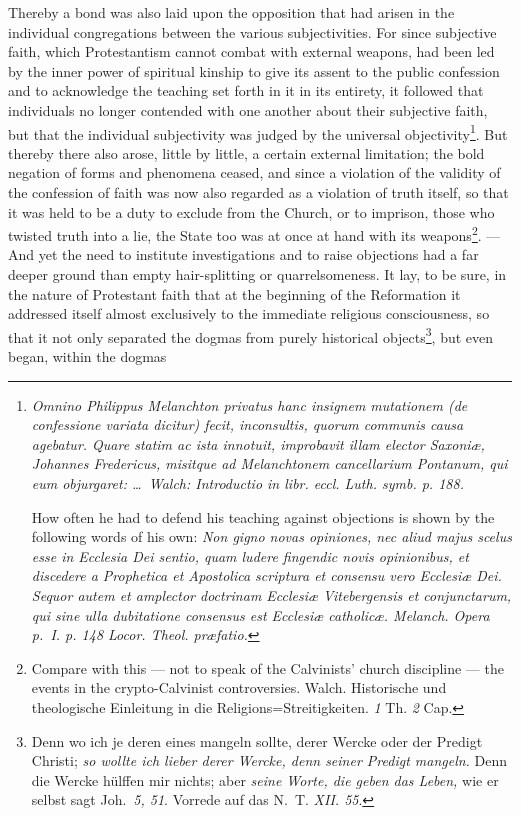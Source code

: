\documentclass[12pt]{book}
\newcommand{\opage}[1]{\marginnote{\footnotesize\textit{[#1]}}}
\begin{document}
Thereby a bond was also laid upon the opposition that had arisen in the
individual congregations between the various subjectivities. For since
subjective faith, which Protestantism cannot combat with external weapons,
had been led by the inner power of spiritual kinship to give its assent to
the public confession and to acknowledge the teaching set forth in it in its
entirety, it followed that individuals no longer contended with one another
about their subjective faith, but that the individual subjectivity was judged
by the universal objectivity\footnote{\textit{Omnino Philippus Melanchton
privatus hanc insignem mutationem (de confessione variata dicitur) fecit,
inconsultis, quorum communis causa agebatur. Quare statim ac ista innotuit,
improbavit illam elector Saxoniæ, Johannes Fredericus, misitque ad
Melanchtonem cancellarium Pontanum, qui eum objurgaret: \ldots\ Walch:
Introductio in libr. eccl. Luth. symb. p. 188.}

How often he had to defend his teaching against objections is shown by the
following words of his own: \textit{Non gigno novas opiniones, nec aliud
majus scelus esse in Ecclesia Dei sentio, quam ludere fingendic novis
opinionibus, et discedere a Prophetica et Apostolica scriptura et consensu
vero Ecclesiæ Dei. \emph{Sequor autem et amplector doctrinam Ecclesiæ
Vitebergensis et conjunctarum, qui sine ulla dubitatione consensus est
Ecclesiæ catholicæ.} Melanch. Opera p.~I. p. 148 Locor. Theol. præfatio.}}.
But thereby there also arose, little
\opage{73} \setcounter{footnote}{0}%
by little, a certain external limitation; the bold negation of forms and
phenomena ceased, and since a violation of the validity of the confession of
faith was now also regarded as a violation of truth itself, so that it was
held to be a duty to exclude from the Church, or to imprison, those who
twisted truth into a lie, the State too was at once at hand with its
weapons\footnote{Compare with this --- not to speak of the Calvinists'
church discipline --- the events in the crypto-Calvinist controversies.
Walch. Historische und theologische Einleitung in die
Religions=Streitigkeiten. \textit{1} Th. \textit{2} Cap.}. --- And yet the
need to institute investigations and to raise objections had a far deeper
ground than empty hair-splitting or quarrelsomeness. It lay, to be sure, in
the nature of Protestant faith that at the beginning of the Reformation it
addressed itself almost exclusively to the immediate religious
consciousness, so that it not only separated the dogmas from purely
historical objects\footnote{Denn wo ich je deren eines mangeln sollte, derer
Wercke oder der Predigt Christi; \emph{so wollte ich lieber derer Wercke, denn
seiner Predigt mangeln.} Denn die Wercke hülffen mir nichts; aber \emph{seine
Worte, die geben das Leben,} wie er selbst sagt Joh.~\textit{5, 51}. Vorrede
auf das N.~T. \textit{XII. 55}.}, but even began, within the dogmas
\end{document}
